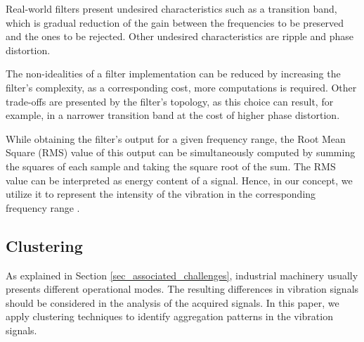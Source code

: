 \documentclass[conference]{IEEEtran}
\begin{document}

Real-world filters present undesired characteristics such as a transition band, which is gradual reduction of the gain between the frequencies to be preserved and the ones to be rejected. Other undesired characteristics are ripple and phase distortion. %

The non-idealities of a filter implementation can be reduced by increasing the filter's complexity, as a corresponding cost, more computations is required. Other trade-offs are presented by the filter's topology, as this choice can result, for example, in a narrower transition band at the cost of higher phase distortion.


While obtaining the filter's output for a given frequency range, the Root Mean Square (RMS) value of this output can be simultaneously computed by summing the squares of each sample and taking the square root of the sum. The RMS value can be interpreted as energy content of a signal. Hence, in our concept, we utilize it to represent the intensity of the vibration in the corresponding frequency range \cite{b3}.


\subsection{Clustering}
\label{sec_clustering}

As explained in Section \ref{sec_associated_challenges}, industrial machinery usually presents different operational modes. The resulting differences in vibration signals should be considered in the analysis of the acquired signals. In this paper, we apply clustering techniques to identify aggregation patterns in the vibration signals.
\end{document}
